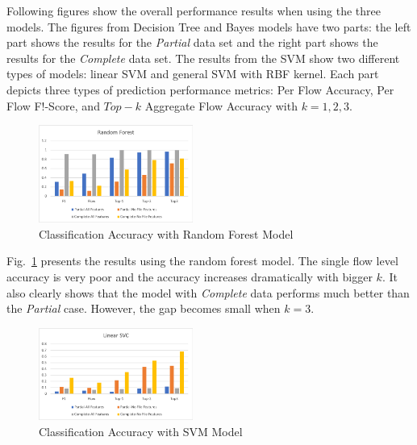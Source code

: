 Following figures show the overall performance results when using the three models. The figures from Decision Tree and Bayes models have two parts: the left part shows the results for the {\it Partial} data set and the right part shows the results for the {\it Complete} data set. The results from the SVM show two different types of models: linear SVM and general SVM with RBF kernel. Each part depicts three types of prediction performance metrics: Per Flow Accuracy, Per Flow F!-Score, and $Top-k$ Aggregate Flow Accuracy with $k=1,2,3$.

\begin{figure}[!ht]
\begin{center}
\includegraphics[width=0.45\textwidth]{./figure/rf-accuracy}
\end{center}
\vspace{-0.05in}
\caption{Classification Accuracy with Random Forest Model}
\vspace{-0.05in}
\label{fig:dt}
\end{figure}

Fig.~\ref{fig:dt} presents the results using the random forest model. The single flow level accuracy is very poor and the accuracy increases dramatically with bigger $k$. It also clearly shows that the model with {\it Complete} data performs much better than the {\it Partial} case. However, the gap becomes small when $k=3$. 

\begin{figure}[!ht]
\begin{center}
\includegraphics[width=0.45\textwidth]{./figure/svc-accuracy}
\end{center}
\vspace{-0.05in}
\caption{Classification Accuracy with SVM Model}
\vspace{-0.05in}
\label{fig:svm}
\end{figure}

